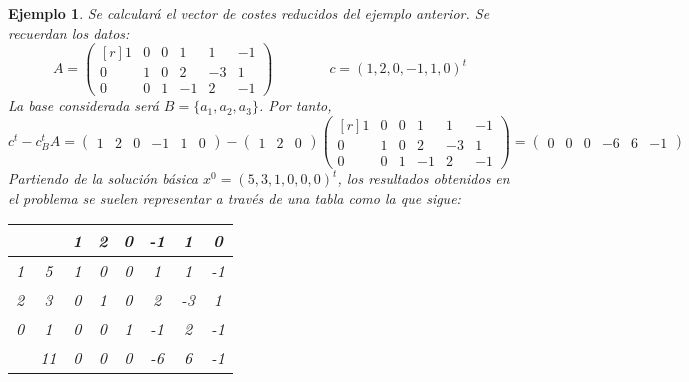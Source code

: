 \documentclass[11pt]{report}
\theoremstyle{mytheorem}
\theoremstyle{mydefinition}
\theoremstyle{myexample}
\newtheorem*{example}{Ejemplo}
\begin{document}
\begin{example}
\label{ex2.2.}
Se calculará el vector de costes reducidos del ejemplo anterior. Se recuerdan los datos:
\[A= \begin{pmatrix*}[r]
    1 & 0 & 0 & 1 & 1 & -1 \\
    0 & 1 & 0 & 2 & -3 & 1 \\
    0 & 0 & 1 & -1 & 2 & -1
\end{pmatrix*} \qquad \qquad c = (1,2,0,-1,1,0)^t\]
La base considerada será $B = \{a_1,a_2,a_3\}$. Por tanto,
\[c^t-c_B^tA = \begin{pmatrix}
    1 & 2 & 0 & -1 & 1 & 0
\end{pmatrix} - \begin{pmatrix}
    1 & 2 & 0
\end{pmatrix} \begin{pmatrix*}[r]
    1 & 0 & 0 & 1 & 1 & -1 \\
    0 & 1 & 0 & 2 & -3 & 1 \\
    0 & 0 & 1 & -1 & 2 & -1
\end{pmatrix*} = \begin{pmatrix}
    0 & 0 & 0 & -6 & 6 & -1
\end{pmatrix}\]
Partiendo de la solución básica $x^0 =(5,3,1,0,0,0)^t$, los resultados obtenidos en el problema se suelen representar a través de una tabla como la que sigue:
\begin{center}
\begin{tabular}{|c|c|c|c|c|c|c|c|}
    \cline{3-8}
    \multicolumn{1}{c}{} & \multicolumn{1}{c|}{} & \multicolumn{1}{c}{1} & \multicolumn{1}{c}{2} & \multicolumn{1}{c}{0} & \multicolumn{1}{c}{-1} & \multicolumn{1}{c}{\phantom{-}1} & \multicolumn{1}{c|}{\phantom{-}0} \\ \hline
    1 & 5 & \multicolumn{1}{c}{1} & \multicolumn{1}{c}{0} & \multicolumn{1}{c}{0} & \multicolumn{1}{c}{\phantom{-}1} & \multicolumn{1}{c}{\phantom{-}1} & \multicolumn{1}{c|}{-1} \\
    2 & 3 & \multicolumn{1}{c}{0} & \multicolumn{1}{c}{1} & \multicolumn{1}{c}{0} & \multicolumn{1}{c}{\phantom{-}2} & \multicolumn{1}{c}{-3} & \multicolumn{1}{c|}{\phantom{-}1} \\
    0 & 1 & \multicolumn{1}{c}{0} & \multicolumn{1}{c}{0} & \multicolumn{1}{c}{1} & \multicolumn{1}{c}{-1} & \multicolumn{1}{c}{\phantom{-}2} & \multicolumn{1}{c|}{-1} \\ \hline
    \multicolumn{1}{c|}{} & 11 & \multicolumn{1}{c}{0} & \multicolumn{1}{c}{0} & \multicolumn{1}{c}{0} & \multicolumn{1}{c}{-6} & \multicolumn{1}{c}{\phantom{-}6} & \multicolumn{1}{c|}{-1} \\

\end{tabular}
\end{center}
\end{example}
\end{document}
